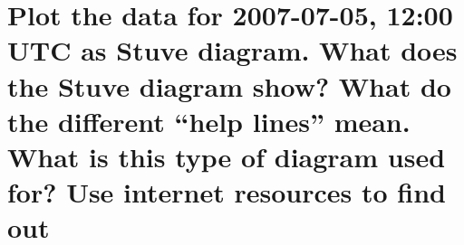 \documentclass{article}
\begin{document}
\newpage
\section{Plot the data for 2007-07-05, 12:00 UTC as Stuve diagram. What does the Stuve diagram show? What do the different “help lines” mean. What is this type of diagram used for? Use internet resources to find out}

\newpage				%


\end{document}
